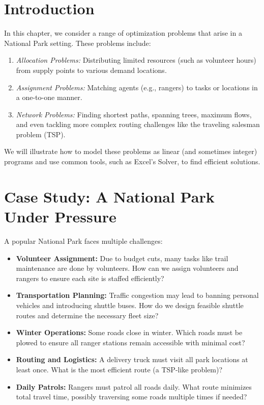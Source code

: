 \section{Introduction}
In this chapter, we consider a range of optimization problems that arise in a National Park setting. These problems include:

\begin{enumerate}
  \item \emph{Allocation Problems:} Distributing limited resources (such as volunteer hours) from supply points to various demand locations.
  \item \emph{Assignment Problems:} Matching agents (e.g., rangers) to tasks or locations in a one-to-one manner.
  \item \emph{Network Problems:} Finding shortest paths, spanning trees, maximum flows, and even tackling more complex routing challenges like the traveling salesman problem (TSP).
\end{enumerate}

We will illustrate how to model these problems as linear (and sometimes integer) programs and use common tools, such as Excel’s Solver, to find efficient solutions.

\section{Case Study: A National Park Under Pressure}
A popular National Park faces multiple challenges:

\begin{itemize}
  \item \textbf{Volunteer Assignment:} Due to budget cuts, many tasks like trail maintenance are done by volunteers. How can we assign volunteers and rangers to ensure each site is staffed efficiently?
  \item \textbf{Transportation Planning:} Traffic congestion may lead to banning personal vehicles and introducing shuttle buses. How do we design feasible shuttle routes and determine the necessary fleet size?
  \item \textbf{Winter Operations:} Some roads close in winter. Which roads must be plowed to ensure all ranger stations remain accessible with minimal cost?
  \item \textbf{Routing and Logistics:} A delivery truck must visit all park locations at least once. What is the most efficient route (a TSP-like problem)?
  \item \textbf{Daily Patrols:} Rangers must patrol all roads daily. What route minimizes total travel time, possibly traversing some roads multiple times if needed?
\end{itemize}


